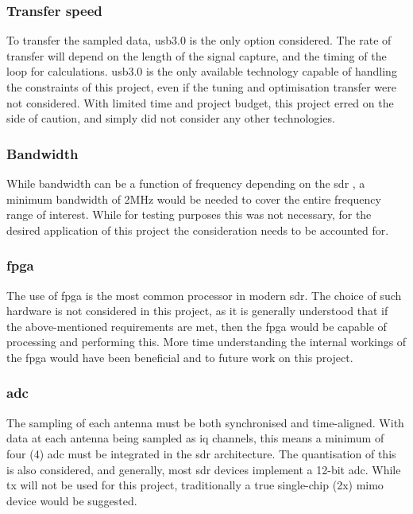 \documentclass[class=report,11pt,crop=false]{standalone}
\begin{document}
\subsubsection{Transfer speed}
To transfer the sampled data, \gls{usb}3.0 is the only option considered. The rate of transfer will depend on the length of the signal capture, and the timing of the loop for calculations. \gls{usb}3.0 is the only available technology capable of handling the constraints of this project, even if the tuning and optimisation transfer were not considered. With limited time and project budget, this project erred on the side of caution, and simply did not consider any other technologies. 

\subsubsection{Bandwidth}
While bandwidth can be a function of frequency depending on the \gls{sdr} \cite{sdr-for-engineers}, a minimum bandwidth of 2MHz would be needed to cover the entire frequency range of interest. While for testing purposes this was not necessary, for the desired application of this project the consideration needs to be accounted for. 

\subsubsection{\gls{fpga}}
The use of \gls{fpga} is the most common processor in modern \gls{sdr}. The choice of such hardware is not considered in this project, as it is generally understood that if the above-mentioned requirements are met, then the \gls{fpga} would be capable of processing and performing this. More time understanding the internal workings of the \gls{fpga} would have been beneficial and to future work on this project.

\subsubsection{\gls{adc}}
The sampling of each antenna must be both synchronised and time-aligned. With data at each antenna being sampled as \gls{iq} channels, this means a minimum of four (4) \gls{adc} must be integrated in the \gls{sdr} architecture. The quantisation of this is also considered, and generally, most \gls{sdr} devices implement a 12-bit \gls{adc}. While \gls{tx} will not be used for this project, traditionally a true single-chip (2x) \gls{mimo} device would be suggested. 
\end{document}
